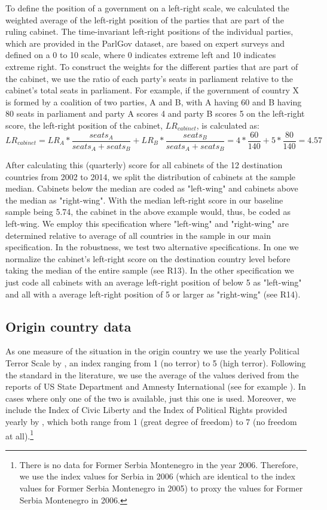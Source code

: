 \documentclass[11pt,a4paper]{scrartcl}
\begin{document}
To define the position of a government on a left-right scale, we calculated the weighted average of the left-right position of the parties that are part of the ruling cabinet. The time-invariant left-right positions of the individual parties, which are provided in the ParlGov dataset, are based on expert surveys and defined on a 0 to 10 scale, where 0 indicates extreme left and 10 indicates extreme right. To construct the weights for the different parties that are part of the cabinet, we use the ratio of each party's seats in parliament relative to the cabinet's total seats in parliament. For example, if the government of country X is formed by a coalition of two parties, A and B, with A having 60 and B having 80 seats in parliament and party A scores 4 and party B scores 5 on the left-right score, the left-right position of the cabinet, $LR_{cabinet}$, is calculated as: 
\begin{equation*}
LR_{cabinet} = LR_{A} * \frac{seats_{A}}{seats_{A} + seats_{B}} +LR_{B} * \frac{seats_{B}}{seats_{A} + seats_{B}} = 4*\frac{60}{140} +5*\frac{80}{140} = 4.57
\end{equation*}

After calculating this (quarterly) score for all cabinets of the 12 destination countries from 2002 to 2014, we split the distribution of cabinets at the sample median. Cabinets below the median are coded as "left-wing" and cabinets above the median as "right-wing". With the median left-right score in our baseline sample being 5.74, the cabinet in the above example would, thus, be coded as left-wing. We employ this specification where "left-wing" and "right-wing" are determined relative to average of all countries in the sample in our main specification. In the robustness, we test two alternative specifications. In one we normalize the cabinet's left-right score on the destination country level before taking the median of the entire sample (see R13). In the other specification we just code all cabinets with an average left-right position of below 5 as "left-wing" and all with a average left-right position of 5 or larger as "right-wing" (see R14).

\subsection{Origin country data}

As one measure of the situation in the origin country we use the yearly Political Terror Scale by \textcite{PTS2017}, an index ranging from 1 (no terror) to 5 (high terror). Following the standard in the literature, we use the average of the values derived from the reports of US State Department and Amnesty International (see for example \textcite{hatton2017}). In cases where only one of the two is available, just this one is used. 
Moreover, we include the Index of Civic Liberty and the Index of Political Rights provided yearly by  \textcite{FHI2017}, which both range from 1 (great degree of freedom) to 7 (no freedom at all).\footnote{There is no data for Former Serbia Montenegro in the year 2006. Therefore, we use the index values for Serbia in 2006 (which are identical to the index values for Former Serbia Montenegro in 2005) to proxy the values for Former Serbia Montenegro in 2006.}
\end{document}
